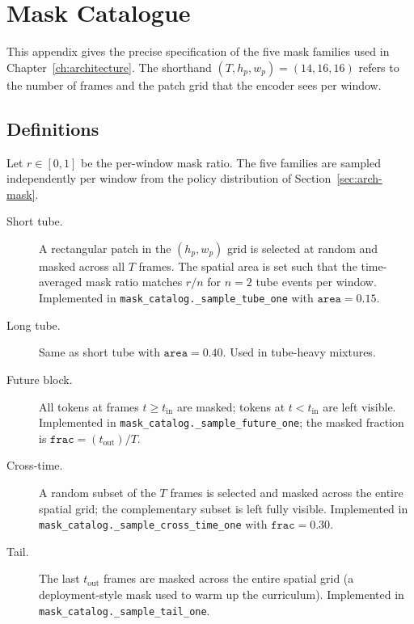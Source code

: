 \chapter{Mask Catalogue}
\label{app:masks}

This appendix gives the precise specification of the five mask
families used in Chapter~\ref{ch:architecture}. The shorthand
$(T, h_{p}, w_{p}) = (14, 16, 16)$ refers to the number of frames
and the patch grid that the encoder sees per window.

\section{Definitions}
\label{app:masks-defs}

Let $r \in [0, 1]$ be the per-window mask ratio. The five
families are sampled independently per window from the policy
distribution of Section~\ref{sec:arch-mask}.

\begin{description}
\item[Short tube.] A rectangular patch in the $(h_{p}, w_{p})$
grid is selected at random and masked across all $T$ frames. The
spatial area is set such that the time-averaged mask ratio matches
$r/n$ for $n = 2$ tube events per window. Implemented in
\texttt{mask\_catalog.\_sample\_tube\_one} with
$\mathtt{area} = 0.15$.

\item[Long tube.] Same as short tube with
$\mathtt{area} = 0.40$. Used in tube-heavy mixtures.

\item[Future block.] All tokens at frames
$t \geq t_{\text{in}}$ are masked; tokens at $t < t_{\text{in}}$
are left visible. Implemented in
\texttt{mask\_catalog.\_sample\_future\_one}; the masked fraction
is $\mathtt{frac} = (t_{\text{out}}) / T$.

\item[Cross-time.] A random subset of the $T$ frames is selected
and masked across the entire spatial grid; the complementary
subset is left fully visible. Implemented in
\texttt{mask\_catalog.\_sample\_cross\_time\_one} with
$\mathtt{frac} = 0.30$.

\item[Tail.] The last $t_{\text{out}}$ frames are masked across
the entire spatial grid (a deployment-style mask used to warm up
the curriculum). Implemented in
\texttt{mask\_catalog.\_sample\_tail\_one}.
\end{description}

